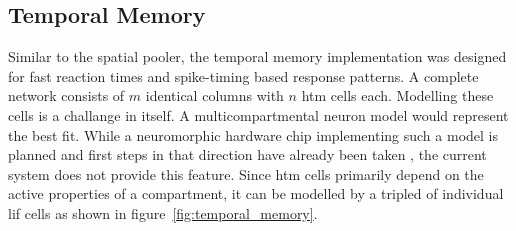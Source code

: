 
\subsection{Temporal Memory}

Similar to the spatial pooler, the temporal memory implementation was designed for fast reaction times and spike-timing based response patterns. A complete network consists of $m$ identical columns with $n$ \gls{htm} cells each. Modelling these cells is a challange in itself. A multicompartmental neuron model would represent the best fit. While a neuromorphic hardware chip implementing such a model is planned and first steps in that direction have already been taken \citep{millner2012development}, the current system does not provide this feature. Since \gls{htm} cells primarily depend on the active properties of a compartment, it can be modelled by a tripled of individual \gls{lif} cells as shown in figure~\ref{fig:temporal_memory}.

